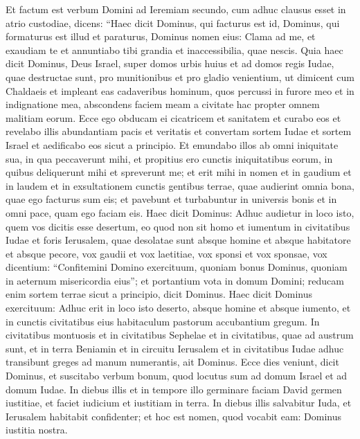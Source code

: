 \begin{biblechapter}  
\verse Et factum est verbum Domini ad Ieremiam secundo, cum adhuc clausus esset in atrio custodiae, dicens: 
\verse “Haec dicit Dominus, qui facturus est id, Dominus, qui formaturus est illud et paraturus, Dominus nomen eius: 
\verse Clama ad me, et exaudiam te et annuntiabo tibi grandia et inaccessibilia, quae nescis.  
\verse Quia haec dicit Dominus, Deus Israel, super domos urbis huius et ad domos regis Iudae, quae destructae sunt, pro munitionibus et pro gladio 
\verse venientium, ut dimicent cum Chaldaeis et impleant eas cadaveribus hominum, quos percussi in furore meo et in indignatione mea, abscondens faciem meam a civitate hac propter omnem malitiam eorum. 
\verse Ecce ego obducam ei cicatricem et sanitatem et curabo eos et revelabo illis abundantiam pacis et veritatis 
\verse et convertam sortem Iudae et sortem Israel et aedificabo eos sicut a principio.  
\verse Et emundabo illos ab omni iniquitate sua, in qua peccaverunt mihi, et propitius ero cunctis iniquitatibus eorum, in quibus deliquerunt mihi et spreverunt me; 
\verse et erit mihi in nomen et in gaudium et in laudem et in exsultationem cunctis gentibus terrae, quae audierint omnia bona, quae ego facturus sum eis; et pavebunt et turbabuntur in universis bonis et in omni pace, quam ego faciam eis. 
\verse Haec dicit Dominus: Adhuc audietur in loco isto, quem vos dicitis esse desertum, eo quod non sit homo et iumentum in civitatibus Iudae et foris Ierusalem, quae desolatae sunt absque homine et absque habitatore et absque pecore, 
\verse vox gaudii et vox laetitiae, vox sponsi et vox sponsae, vox dicentium: “Confitemini Domino exercituum, quoniam bonus Dominus, quoniam in aeternum misericordia eius”; et portantium vota in domum Domini; reducam enim sortem terrae sicut a principio, dicit Dominus. 
\verse Haec dicit Dominus exercituum: Adhuc erit in loco isto deserto, absque homine et absque iumento, et in cunctis civitatibus eius habitaculum pastorum accubantium gregum. 
\verse In civitatibus montuosis et in civitatibus Sephelae et in civitatibus, quae ad austrum sunt, et in terra Beniamin et in circuitu Ierusalem et in civitatibus Iudae adhuc transibunt greges ad manum numerantis, ait Dominus. 
\verse Ecce dies veniunt, dicit Dominus, et suscitabo verbum bonum, quod locutus sum ad domum Israel et ad domum Iudae. 
\verse In diebus illis et in tempore illo germinare faciam David germen iustitiae, et faciet iudicium et iustitiam in terra. 
\verse In diebus illis salvabitur Iuda, et Ierusalem habitabit confidenter; et hoc est nomen, quod vocabit eam: Dominus iustitia nostra. 

\end{biblechapter}
